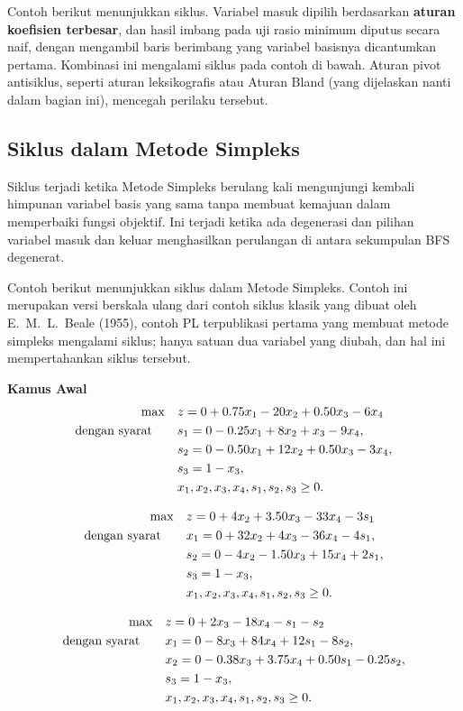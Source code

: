 Contoh berikut menunjukkan siklus. Variabel masuk dipilih berdasarkan \textbf{aturan koefisien terbesar}, dan hasil imbang pada uji rasio minimum diputus secara naif, dengan mengambil baris berimbang yang variabel basisnya dicantumkan pertama. Kombinasi ini mengalami siklus pada contoh di bawah. Aturan pivot antisiklus, seperti aturan leksikografis atau Aturan Bland (yang dijelaskan nanti dalam bagian ini), mencegah perilaku tersebut.

\subsection{Siklus dalam Metode Simpleks}
Siklus terjadi ketika Metode Simpleks berulang kali mengunjungi kembali himpunan variabel basis yang sama tanpa membuat kemajuan dalam memperbaiki fungsi objektif. Ini terjadi ketika ada degenerasi dan pilihan variabel masuk dan keluar menghasilkan perulangan di antara sekumpulan BFS degenerat.

Contoh berikut menunjukkan siklus dalam Metode Simpleks. Contoh ini merupakan versi berskala ulang dari contoh siklus klasik yang dibuat oleh E.~M.~L.~Beale (1955), contoh PL terpublikasi pertama yang membuat metode simpleks mengalami siklus; hanya satuan dua variabel yang diubah, dan hal ini mempertahankan siklus tersebut.

\textbf{Kamus Awal}
\[
\begin{aligned}
\max \quad & z = 0 + 0.75x_1 - 20x_2 + 0.50x_3 - 6x_4 \\
\mbox{dengan syarat}\quad \quad 
& s_1 = 0 - 0.25x_1 + 8x_2 + x_3 - 9x_4, \\
& s_2 = 0 - 0.50x_1 + 12x_2 + 0.50x_3 - 3x_4, \\
& s_3 = 1 - x_3, \\
& x_1, x_2, x_3, x_4, s_1, s_2, s_3 \geq 0.
\end{aligned}
\]

\[
\begin{aligned}
\max \quad & z = 0 + 4x_2 + 3.50x_3 - 33x_4 - 3s_1 \\
\mbox{dengan syarat}\quad \quad 
& x_1 = 0 + 32x_2 + 4x_3 - 36x_4 - 4s_1, \\
& s_2 = 0 - 4x_2 - 1.50x_3 + 15x_4 + 2s_1, \\
& s_3 = 1 - x_3, \\
& x_1, x_2, x_3, x_4, s_1, s_2, s_3 \geq 0.
\end{aligned}
\]

\[
\begin{aligned}
\max \quad & z = 0 + 2x_3 - 18x_4 - s_1 - s_2 \\
\mbox{dengan syarat}\quad \quad 
& x_1 = 0 - 8x_3 + 84x_4 + 12s_1 - 8s_2, \\
& x_2 = 0 - 0.38x_3 + 3.75x_4 + 0.50s_1 - 0.25s_2, \\
& s_3 = 1 - x_3, \\
& x_1, x_2, x_3, x_4, s_1, s_2, s_3 \geq 0.
\end{aligned}
\]

